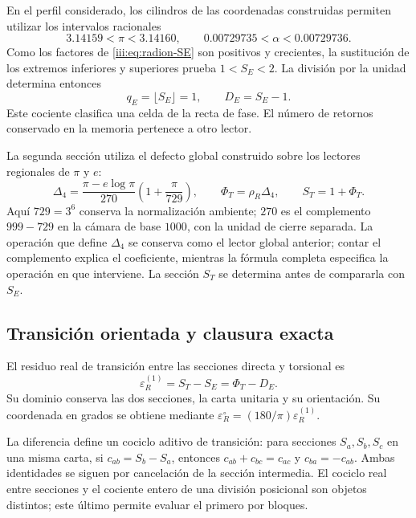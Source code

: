 En el perfil considerado, los cilindros de las coordenadas construidas
permiten utilizar los intervalos racionales
\[
 3.14159<\pi<3.14160,\qquad
 0.00729735<\alpha<0.00729736.
\]
Como los factores de \eqref{iii:eq:radion-SE} son positivos y crecientes,
la sustitución de los extremos inferiores y superiores prueba
$1<S_E<2$. La división por la unidad determina entonces
\begin{equation}
 q_E=\lfloor S_E\rfloor=1,\qquad D_E=S_E-1.
 \label{iii:eq:radion-DE}
\end{equation}
Este cociente clasifica una celda de la recta de fase. El número de retornos
conservado en la memoria pertenece a otro lector.

La segunda sección utiliza el defecto global construido sobre los lectores
regionales de $\pi$ y $e$:
\begin{equation}
 \Delta_4=\frac{\pi-e\log\pi}{270}
             \left(1+\frac{\pi}{729}\right),\qquad
 \Phi_T=\rho_R\Delta_4,\qquad S_T=1+\Phi_T.
 \label{iii:eq:radion-ST}
\end{equation}
Aquí $729=3^6$ conserva la normalización ambiente; $270$ es el
complemento $999-729$ en la cámara de base $1000$, con la unidad de cierre
separada. La operación que define $\Delta_4$ se conserva como el lector
global anterior; contar el complemento explica el coeficiente, mientras
la fórmula completa especifica la operación en que interviene.
La sección $S_T$ se determina antes de compararla con $S_E$.

\subsection{Transición orientada y clausura exacta}
\label{iii:subsec:radion-cociclo}

\begin{definition}
El residuo real de transición entre las secciones directa y torsional es
\begin{equation}
 \varepsilon_R^{(1)}=S_T-S_E=\Phi_T-D_E.
 \label{iii:eq:radion-epsilon}
\end{equation}
Su dominio conserva las dos secciones, la carta unitaria y su orientación.
Su coordenada en grados se obtiene mediante
$\varepsilon_R^\circ=(180/\pi)\varepsilon_R^{(1)}$.
\end{definition}

La diferencia define un cociclo aditivo de transición: para secciones
$S_a,S_b,S_c$ en una misma carta, si $c_{ab}=S_b-S_a$, entonces
$c_{ab}+c_{bc}=c_{ac}$ y $c_{ba}=-c_{ab}$. Ambas identidades se siguen
por cancelación de la sección intermedia. El cociclo real entre secciones
y el cociente entero de una división posicional son objetos distintos;
este último permite evaluar el primero por bloques.

